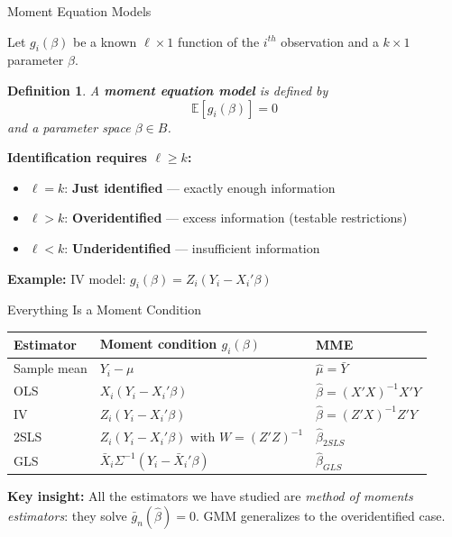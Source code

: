 \documentclass[aspectratio=169, handout, t]{beamer}
\newtheorem{defn}{Definition}
\numberwithin{equation}{section}
\begin{document}
\begin{frame}{Moment Equation Models}

Let $g_i(\beta)$ be a known $\ell \times 1$ function of the $i^{th}$ observation and a $k \times 1$ parameter $\beta$.

\begin{defn}
A \textbf{moment equation model} is defined by
$$\mathbb{E}[g_i(\beta)] = 0$$
and a parameter space $\beta \in B$.
\end{defn}

\medskip
\textbf{Identification requires $\ell \geq k$:}
\begin{itemize}
\item $\ell = k$: \textbf{Just identified} --- exactly enough information
\item $\ell > k$: \textbf{Overidentified} --- excess information (testable restrictions)
\item $\ell < k$: \textbf{Underidentified} --- insufficient information
\end{itemize}

\smallskip
\textbf{Example:} IV model: $g_i(\beta) = Z_i(Y_i - X_i'\beta)$

\end{frame}

\begin{frame}{Everything Is a Moment Condition}

\begin{table}[h]
\centering
\small
\begin{tabular}{lll}
\toprule
\textbf{Estimator} & \textbf{Moment condition $g_i(\beta)$} & \textbf{MME} \\
\midrule
Sample mean & $Y_i - \mu$ & $\hat\mu = \bar{Y}$ \\[4pt]
OLS & $X_i(Y_i - X_i'\beta)$ & $\hat\beta = (X'X)^{-1}X'Y$ \\[4pt]
IV & $Z_i(Y_i - X_i'\beta)$ & $\hat\beta = (Z'X)^{-1}Z'Y$ \\[4pt]
2SLS & $Z_i(Y_i - X_i'\beta)$ with $W=(Z'Z)^{-1}$ & $\hat\beta_{2SLS}$ \\[4pt]
GLS & $\bar X_i\Sigma^{-1}(Y_i - \bar X_i'\beta)$ & $\hat\beta_{GLS}$ \\
\bottomrule
\end{tabular}
\end{table}

\medskip
\begin{tcolorbox}[colback=blue!5, colframe=blue!50]
\textbf{Key insight:} All the estimators we have studied are \textit{method of moments estimators}: they solve $\bar{g}_n(\hat\beta) = 0$.  GMM generalizes to the overidentified case.
\end{tcolorbox}

\end{frame}
\end{document}
